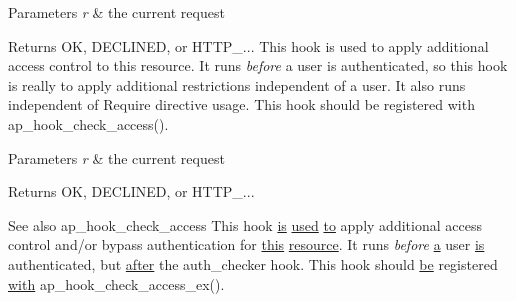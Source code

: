 \begin{DoxyParams}{Parameters}
{\em r} & the current request \\
\hline
\end{DoxyParams}
\begin{DoxyReturn}{Returns}
OK, D\+E\+C\+L\+I\+N\+ED, or H\+T\+T\+P\+\_\+... This hook is used to apply additional access control to this resource. It runs {\itshape before} a user is authenticated, so this hook is really to apply additional restrictions independent of a user. It also runs independent of \textquotesingle{}Require\textquotesingle{} directive usage. This hook should be registered with ap\+\_\+hook\+\_\+check\+\_\+access().
\end{DoxyReturn}

\begin{DoxyParams}{Parameters}
{\em r} & the current request \\
\hline
\end{DoxyParams}
\begin{DoxyReturn}{Returns}
OK, D\+E\+C\+L\+I\+N\+ED, or H\+T\+T\+P\+\_\+...
\end{DoxyReturn}
\begin{DoxySeeAlso}{See also}
ap\+\_\+hook\+\_\+check\+\_\+access This hook \hyperlink{NON-AUTOTOOLS-BUILD_8txt_a2569119f3fd3f0d7d7ecea3c96acb0bf}{is} \hyperlink{pcregrep_8txt_ac199431a7baad211fadcdb6c45bfe7c0}{used} \hyperlink{pcretest_8txt_aa22c98f630e4b3fe86ee17ce5150c62f}{to} apply additional access control and/or bypass authentication for \hyperlink{pcregrep_8txt_a1d4586f0a85ecec85237e5fb0f611dd1}{this} \hyperlink{group__APR__Util__RL_gaa6244aacafcc4ec1d0727bdb32614b11}{resource}. It runs {\itshape before} \hyperlink{pcre_8txt_a841271aab70f5cda9412a19c7753f02c}{a} user \hyperlink{NON-AUTOTOOLS-BUILD_8txt_a2569119f3fd3f0d7d7ecea3c96acb0bf}{is} authenticated, but \hyperlink{group__MOD__PROXY_gabe5742ecd24263fc01da937ad820d3fa}{after} the auth\+\_\+checker hook. This hook should \hyperlink{NON-AUTOTOOLS-BUILD_8txt_ac08ce70cbd4f453457597ad15ecbebdd}{be} registered \hyperlink{group__apr__atomic_ga62bdcea60b77e638d3d88947a34aff05}{with} ap\+\_\+hook\+\_\+check\+\_\+access\+\_\+ex().
\end{DoxySeeAlso}


